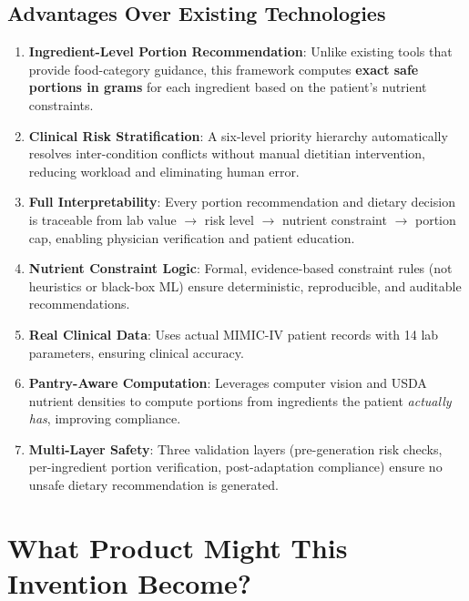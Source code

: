 \documentclass[a4paper,12pt]{article}
\begin{document}
\subsection*{Advantages Over Existing Technologies}
\begin{enumerate}[itemsep=0.3em]
    \item \textbf{Ingredient-Level Portion Recommendation}: Unlike existing tools that provide food-category guidance, this framework computes \textbf{exact safe portions in grams} for each ingredient based on the patient's nutrient constraints.
    \item \textbf{Clinical Risk Stratification}: A six-level priority hierarchy automatically resolves inter-condition conflicts without manual dietitian intervention, reducing workload and eliminating human error.
    \item \textbf{Full Interpretability}: Every portion recommendation and dietary decision is traceable from lab value $\rightarrow$ risk level $\rightarrow$ nutrient constraint $\rightarrow$ portion cap, enabling physician verification and patient education.
    \item \textbf{Nutrient Constraint Logic}: Formal, evidence-based constraint rules (not heuristics or black-box ML) ensure deterministic, reproducible, and auditable recommendations.
    \item \textbf{Real Clinical Data}: Uses actual MIMIC-IV patient records with 14 lab parameters, ensuring clinical accuracy.
    \item \textbf{Pantry-Aware Computation}: Leverages computer vision and USDA nutrient densities to compute portions from ingredients the patient \textit{actually has}, improving compliance.
    \item \textbf{Multi-Layer Safety}: Three validation layers (pre-generation risk checks, per-ingredient portion verification, post-adaptation compliance) ensure no unsafe dietary recommendation is generated.
\end{enumerate}

\section*{What Product Might This Invention Become?}
\end{document}
